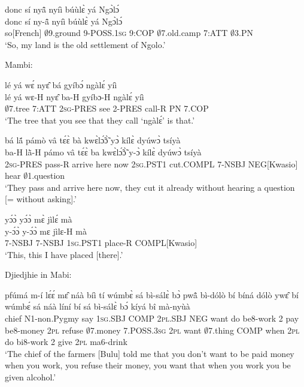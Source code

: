 \begin{exe} 
\exC\label{227} 
  \glll donc sí nyã̂ nyíì búùlɛ̀ yá Ngɔ̀lɔ́\\
        donc sí ny-ã̂ nyíì búùlɛ̀ yá Ngɔ̀lɔ́ \\
        so[French] $\emptyset$9.ground 9-POSS.1\textsc{sg} 9:COP $\emptyset$7.old.camp 7:ATT $\emptyset$3.PN  \\
    \trans `So, my land is the old settlement of Ngolo.'
\end{exe}

\noindent Mambi:

\begin{exe} 
\exC\label{228} 
  \glll lé yá wɛ́ nyɛ̂ bá gyíbɔ́ ngàlɛ́ yíì \\
        lé yá wɛ-H nyɛ̂ ba-H gyíbɔ-H ngàlɛ́ yíì \\
       $\emptyset$7.tree 7:ATT 2\textsc{sg}-PRES see 2-PRES call-R PN 7.COP   \\
    \trans `The tree that you see that they call `ngàlɛ́' is that.'
\end{exe}

\begin{exe} 
\exC\label{229} 
  \glll bá lã́ pámò vâ tɛ́ɛ̀ bà kwɛ̀lɔ̃́ɔ̃̀ yɔ̀ kílɛ̀ dyúwɔ̀  tsíyà \\
      ba-H lã̀-H pámo vâ tɛ́ɛ̀ ba kwɛ̀lɔ̃́ɔ̃̀ y-ɔ̀ kílɛ̀ dyúwɔ̀  tsíyà \\
       2\textsc{sg}-PRES pass-R arrive here now 2\textsc{sg}.PST1 cut.COMPL 7-NSBJ NEG[Kwasio] hear $\emptyset$1.question  \\
    \trans `They pass and arrive here now, they cut it already without hearing a question [= without asking].'
\end{exe}

\begin{exe} 
\exC\label{230} 
  \glll  yɔ́ɔ̀ yɔ́ɔ̀ mɛ̀ jìlɛ́ mà \\
       y-ɔ́ɔ̀ y-ɔ́ɔ̀ mɛ jìlɛ-H mà \\
      7-NSBJ 7-NSBJ 1\textsc{sg}.PST1 place-R COMPL[Kwasio]    \\
    \trans `This, this I have placed [there].'
\end{exe}

\noindent Djiedjhie in Mabi:

\begin{exe} 
\exC\label{231}  
  \gll pfúmá m-í lɛ́ɛ́ mɛ̂ náà bíì tí wúmbɛ̀ sá bì-sálɛ̀ bɔ̀ pwã̂ bì-dólò bí bíná dólò ywɛ̂ bí wúmbɛ́ sá náà líní bí sá bì-sálɛ̀ bɔ́ kíyá bî mà-nyùà  \\
        chief N1-non.Pygmy say 1\textsc{sg}.SBJ COMP 2\textsc{pl}.SBJ NEG want do be8-work 2 pay be8-money 2\textsc{pl} refuse $\emptyset$7.money 7.POSS.3\textsc{sg} 2\textsc{pl} want $\emptyset$7.thing COMP when 2\textsc{pl} do bi8-work 2 give 2\textsc{pl} ma6-drink \\
    \trans `The chief of the farmers [Bulu] told me that you don't want to be paid money when you work, you refuse their money, you want that when you work you be given alcohol.'
\end{exe}

